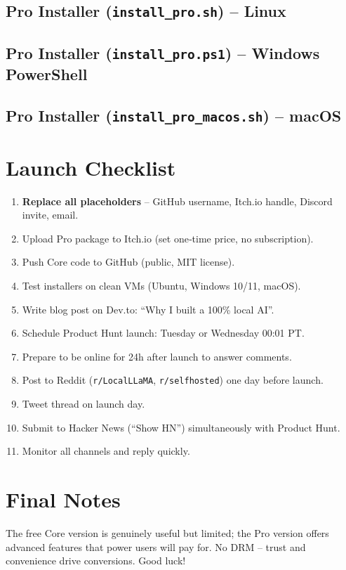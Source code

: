\documentclass[11pt,a4paper]{article}
\begin{document}
\subsection{Pro Installer (\texttt{install\_pro.sh}) – Linux}


\subsection{Pro Installer (\texttt{install\_pro.ps1}) – Windows PowerShell}


\subsection{Pro Installer (\texttt{install\_pro\_macos.sh}) – macOS}


\newpage

\section{Launch Checklist}
\label{sec:checklist}
\begin{enumerate}
    \item \textbf{Replace all placeholders} – GitHub username, Itch.io handle, Discord invite, email.
    \item Upload Pro package to Itch.io (set one‑time price, no subscription).
    \item Push Core code to GitHub (public, MIT license).
    \item Test installers on clean VMs (Ubuntu, Windows 10/11, macOS).
    \item Write blog post on Dev.to: “Why I built a 100\% local AI”.
    \item Schedule Product Hunt launch: Tuesday or Wednesday 00:01 PT.
    \item Prepare to be online for 24h after launch to answer comments.
    \item Post to Reddit (\texttt{r/LocalLLaMA}, \texttt{r/selfhosted}) one day before launch.
    \item Tweet thread on launch day.
    \item Submit to Hacker News (“Show HN”) simultaneously with Product Hunt.
    \item Monitor all channels and reply quickly.
\end{enumerate}

\section{Final Notes}
The free Core version is genuinely useful but limited; the Pro version offers advanced features that power users will pay for.  
No DRM – trust and convenience drive conversions. Good luck!
\end{document}
